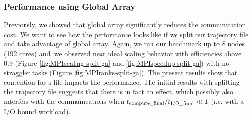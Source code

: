 \subsubsection*{Performance using Global Array}
Previously, we showed that global array significantly reduces the communication cost. 
We want to see how the performance looks like if we split our trajectory file and take advantage of global array.
Again, we ran our benchmark up to 8 nodes (192 cores) and, we observed near ideal scaling behavior with efficiencies above 0.9 (Figure \ref{fig:MPIscaling-split-ga} and \ref{fig:MPIspeedup-split-ga}) with no straggler tasks (Figure \ref{fig:MPIranks-split-ga}).  
The present results show that contention for a file impacts the performance. 
The initial results with splitting the trajectory file suggests that there is in fact an effect, which possibly also interfers with the communications when ${t}_{\text{compute\_final}}/{t}_{\text{I/O\_final}} \ll 1$ (i.e. with a I/O bound workload).

